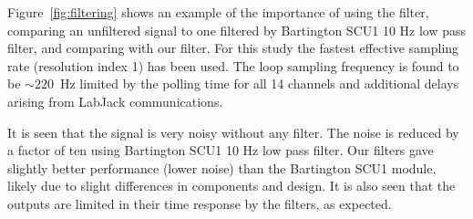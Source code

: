 
Figure~\ref{fig:filtering} shows an example of the importance of using
the filter, comparing an unfiltered signal to one filtered by
Bartington SCU1 10 Hz low pass filter, and comparing with our
filter.  For this study the fastest effective sampling rate
(resolution index 1) has been used.  The loop sampling frequency is
found to be $\sim 220$~Hz limited by the polling time for all 14
channels and additional delays arising from LabJack communications.

It is seen that the signal is very noisy without any filter. The noise
is reduced by a factor of ten using Bartington SCU1 10 Hz low pass
filter.  Our filters gave slightly better performance (lower noise)
than the Bartington SCU1 module, likely due to slight differences in
components and design.  It is also seen that the outputs are limited
in their time response by the filters, as expected.


